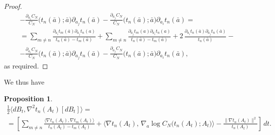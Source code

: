 \documentclass[12pt,reqno]{amsart}
\theoremstyle{plain}
\newtheorem{prop}{Proposition}[section]
\theoremstyle{definition}
\theoremstyle{remark}
\begin{document}
\begin{proof}
\begin{multline}
- \frac{\partial_{a_i} C_N}{ C_N} \!\bigl(t_n(\bar a);\bar a \bigr)\partial_{a_j}t_n(\bar a)- \frac{\partial_{a_j} C_N}{ C_N} \!\bigl(t_n(\bar a);\bar a \bigr)\partial_{a_i}t_n(\bar a)= \\ = \sum_{m\neq n}\frac{\partial_{a_i}t_m(\bar a) \partial_{a_j} t_n(a)}{t_n(\bar a)-t_m(\bar a)} + \sum_{m\neq n}\frac{\partial_{a_j}t_m(a) \partial_{a_i} t_n(a)}{t_n(\bar a)-t_m(\bar a)}+2 \,\frac{\partial_{a_i}t_n(\bar a)\partial_{a_j}t_n(\bar a)}{t_n(\bar a)}-\\
- \frac{\partial_{a_i} C_N}{ C_N} \!\bigl(t_n(\bar a);\bar a \bigr)\partial_{a_j}t_n(\bar a)- \frac{\partial_{a_j} C_N}{ C_N} \!\bigl(t_n(\bar a);\bar a \bigr)\partial_{a_i}t_n(\bar a),
\end{multline} as required. \end{proof}

We thus have 

\begin{prop}\label{prop:Ito-from-6.2} 
\begin{multline}\label{eq:Ito-from-6.2}
\frac12\big\langle dB_t,\nabla^2 t_n(A_t)[dB_t]\big\rangle
=\\ =\left [ \sum_{m\neq n}\frac{\langle \nabla t_n(A_t),\nabla t_m(A_t)\rangle}{t_n(A_t)-t_m(A_t)}
+\Big\langle \nabla t_n(A_t),\,\nabla_a \log C_N \!\bigl(t_n(A_t);A_t\bigr)\Big\rangle
-\frac{\|\nabla t_n(A_t)\|^2}{t_n(A_t)}\right ] \,dt.
\end{multline}
\end{prop}
\end{document}
